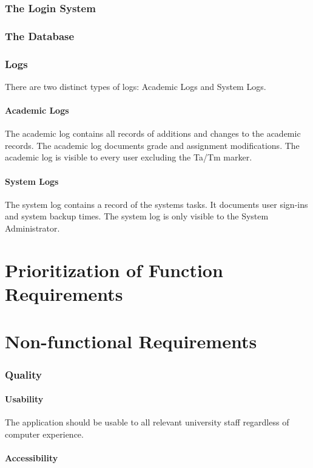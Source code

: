 \documentclass{article}
\begin{document}
\section{The Login System}

\section{The Database}

\section{Logs}
There are two distinct types of logs: Academic Logs and System Logs.
\subsection{Academic Logs}
The academic log contains all records of additions and changes to the academic records.
The academic log documents grade and assignment modifications.  The academic log
is visible to every user excluding the Ta/Tm marker.
\subsection{System Logs}
The system log contains a record of the systems tasks.  It documents user sign-ins
and system backup times. The system log is only visible to the System Administrator.

\part{Prioritization of Function Requirements}

\part{Non-functional Requirements}
\section{Quality}
\subsection{Usability}
The application should be usable to all relevant university staff
regardless of computer experience.
\subsection{Accessibility}
\end{document}
